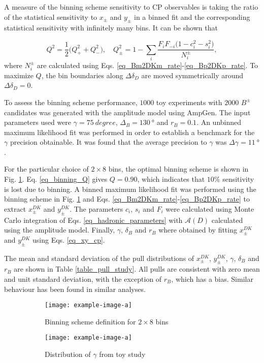 \documentclass[12pt, a4paper, notitlepage, onecolumn]{article}
\numberwithin{equation}{section}
\begin{document}
A measure of the binning scheme sensitivity to CP observables is taking the ratio of the statistical sensitivity to $x_\pm$ and $y_\pm$ in a binned fit and the corresponding statistical sensitivity with infinitely many bins. It can be shown that

\begin{equation}
  Q^2 = \frac{1}{2}\big(Q^2_+ + Q^2_-\big), \quad Q^2_\pm = 1 - \sum_i\frac{F_iF_{-i}\big(1 - c_i^2 - s_i^2\big)}{N_i^\pm},
  \label{eq_binning_Q}
\end{equation}
where $N_i^\pm$ are calculated using Eqs. \eqref{eq_Bm2DKm_rate}-\eqref{eq_Bp2DKp_rate}. To maximize $Q$, the bin boundaries along $\Delta\delta_D$ are moved symmetrically around $\Delta\delta_D = 0$.

To assess the binning scheme performance, $1000$ toy experiments with $2000$ $B^\pm$ candidates was generated with the amplitude model using AmpGen. The input parameters used were $\gamma = \SI{75}{degree}$, $\Delta_B = \SI{130}{\degree}$ and $r_B = 0.1$. An unbinned maximum likelihood fit was performed in order to establish a benchmark for the $\gamma$ precision obtainable. It was found that the average precision to $\gamma$ was $\Delta\gamma = \SI{11}{\degree}$.

For the particular choice of $2\times 8$ bins, the optimal binning scheme is shown in Fig. \ref{fig_binning_scheme}. Eq. \eqref{eq_binning_Q} gives $Q = 0.90$, which indicates that $10\%$ sensitivity is lost due to binning. A binned maximum likelihood fit was performed using the binning scheme in Fig. \ref{fig_binning_scheme} and Eqs. \eqref{eq_Bm2DKm_rate}-\eqref{eq_Bp2DKp_rate} to extract $x_\pm^{DK}$ and $y_\pm^{DK}$. The parameters $c_i$, $s_i$ and $F_i$ were calculated using Monte Carlo integration of Eqs. \eqref{eq_hadronic_parameters} with $\mathcal{A}(D)$ calculated using the amplitude model. Finally, $\gamma$, $\delta_B$ and $r_B$ where obtained by fitting $x_\pm^{DK}$ and $y_\pm^{DK}$ using Eqs. \eqref{eq_xy_cp}.

The mean and standard deviation of the pull distributions of $x_\pm^{DK}$, $y_\pm^{DK}$, $\gamma$, $\delta_B$ and $r_B$ are shown in Table \ref{table_pull_study}. All pulls are consistent with zero mean and unit standard deviation, with the exception of $r_B$, which has a bias. Similar behaviour has been found in similar analyses.

\begin{figure}[H] 
  \centering
  \begin{subfigure}{0.5\textwidth}
    \centering
    \texttt{[image: example-image-a]}
    \caption{Binning scheme definition for $2\times 8$ bins}
    \label{fig_binning_scheme}
  \end{subfigure}%
  \begin{subfigure}{0.5\textwidth}
    \centering
    \texttt{[image: example-image-a]}
    \caption{Distribution of $\gamma$ from toy study}
    \label{fig_gamma_pull_study}
  \end{subfigure}
  \caption{}
\end{figure}
\end{document}
